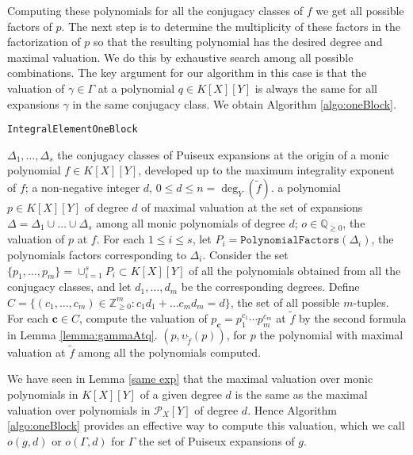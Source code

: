 \documentclass[a4paper,11pt]{amsart}%
\theoremstyle{definition}
\theoremstyle{plain}
\theoremstyle{remark}
\newcommand{\Q}{{\mathbb Q}}
\newcommand{\Z}{{\mathbb Z}}
\newcommand{\Px}{{\mathcal{P}_X}}
\begin{document}
\vspace{.5cm}

Computing these polynomials for all the conjugacy classes of $f$ we get all possible factors of $p$.
The next step is to determine the multiplicity of these factors in the factorization of $p$ so that the resulting polynomial has the desired degree and maximal valuation. We do this by exhaustive search among all possible combinations.
The key argument for our algorithm in this case is that the valuation of $\gamma \in \Gamma$ at a polynomial $q \in K[X][Y]$ is always the same for all expansions $\gamma$ in the same conjugacy class.
We obtain Algorithm \ref{algo:oneBlock}.


\begin{algorithm}[h]                      %
\caption{\texttt{IntegralElementOneBlock}}          %
\label{algo:oneBlock}
\begin{algorithmic}[1]
\REQUIRE $\Delta_1, \dots, \Delta_s$ the conjugacy classes of Puiseux expansions at the origin of a monic polynomial $f \in K[X][Y]$, developed up to the maximum integrality exponent of $f$; a non-negative integer $d$, $0 \leq d \leq n = \deg_Y(\tilde f)$.
\ENSURE a polynomial $p \in K[X][Y]$ of degree $d$ of maximal valuation at the set of expansions $\Delta = \Delta_1 \cup \dots \cup \Delta_s$ among all monic polynomials of degree $d$; $o \in \Q_{\geq 0}$, the valuation of $p$ at $f$.
\STATE For each $1 \le i \le s$, let $P_i = \texttt{PolynomialFactors}(\Delta_i)$, the polynomials factors corresponding to $\Delta_i$.
\STATE Consider the set $\{p_1, \dots, p_m\} = \cup_{i=1}^s P_i \subset K[X][Y]$ of all the polynomials obtained from all the conjugacy classes, and let $d_1, \dots, d_m$ be the corresponding degrees.
\STATE Define $C = \{(c_1, \dots, c_m) \in \Z_{\ge 0}^m : c_1 d_1  + \dots c_m d_m = d\}$, the set of all possible $m$-tuples.
\STATE For each $\bm{c} \in C$, compute the valuation of $p_{\bm c} = p_1^{c_1}\cdots p_m^{c_m}$ at $\tilde f$ by the second formula in Lemma \ref{lemma:gammaAtq}.
\RETURN $(p, \upsilon_{\tilde f}(p))$, for $p$ the polynomial with maximal valuation at $\tilde f$ among all the polynomials computed.
\end{algorithmic}
\end{algorithm}


We have seen in Lemma \ref{same exp} that the maximal valuation over monic polynomials in $K[X][Y]$ of a given degree $d$ is the same as the maximal valuation over polynomials in $\Px[Y]$ of degree $d$. Hence Algorithm \ref{algo:oneBlock} provides an effective way to compute this valuation, which we call $o(g,d)$ or $o(\Gamma, d)$ for $\Gamma$ the set of Puiseux expansions of $g$.
\end{document}
